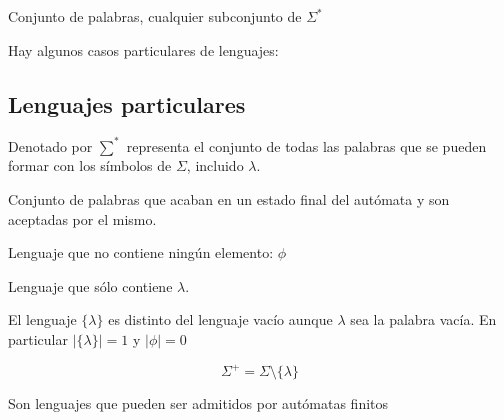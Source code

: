 \documentclass{apuntes}
\begin{document}
\begin{defn}[Lenguaje]
Conjunto de palabras, cualquier subconjunto de $\Sigma^*$
\end{defn}

Hay algunos casos particulares de lenguajes:
\subsection{Lenguajes particulares}
\begin{defn}
Denotado por $\sum^*$ representa el conjunto de todas las palabras que se pueden formar con los símbolos de $\Sigma$, incluido $\lambda$.
\end{defn}

\begin{defn}
Conjunto de palabras que acaban en un estado final del autómata y son aceptadas por el mismo.
\end{defn}

\begin{defn}
Lenguaje que no contiene ningún elemento: $\phi$
\end{defn}

\begin{defn}
Lenguaje que sólo contiene $\lambda$.
\end{defn}
El lenguaje $\lbrace \lambda \rbrace$ es distinto del lenguaje vacío aunque $\lambda$ sea la palabra vacía. En particular $|\{\lambda\}|=1$ y $|\phi|=0$

\begin{defn} 
\[ \Sigma^+ = \Sigma \setminus \lbrace \lambda \rbrace \]
\end{defn}

\begin{defn}
Son lenguajes que pueden ser admitidos por autómatas finitos
\end{defn}
\end{document}
